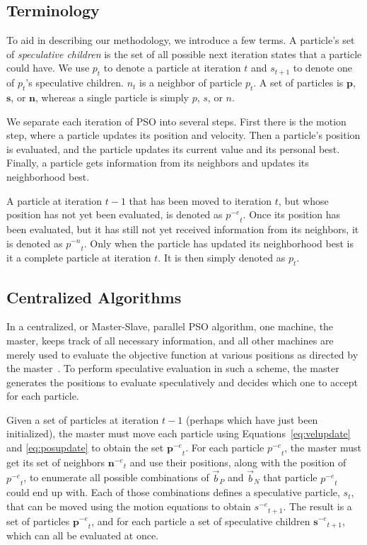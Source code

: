 \documentclass[conference,letterpaper]{IEEEtran}
\providecommand{\nbest}{\ensuremath{\Vec{b}_N}}
\providecommand{\pbest}{\ensuremath{\Vec{b}_P}}
\providecommand{\noeval}[1]{\ensuremath{#1^{-e}}}
\providecommand{\nonbest}[1]{\ensuremath{#1^{-n}}}
\providecommand{\p}{\ensuremath{p}}
\providecommand{\pset}{\ensuremath{\mathbf{p}}}
\providecommand{\s}{\ensuremath{s}}
\providecommand{\sset}{\ensuremath{\mathbf{s}}}
\providecommand{\n}{\ensuremath{n}}
\providecommand{\nset}{\ensuremath{\mathbf{n}}}
\begin{document}
\subsection{Terminology}

To aid in describing our methodology, we introduce a few terms.  A particle's
set of \emph{speculative children} is the set of all possible next iteration
states that a particle could have.  We use $\p_t$ to denote a particle at
iteration $t$ and $\s_{t+1}$ to denote one of $\p_t$'s speculative children.
$\n_t$ is a neighbor of particle $\p_t$.  A set of particles is $\pset$,
$\sset$, or $\nset$, whereas a single particle is simply $\p$, $\s$, or $\n$.

We separate each iteration of PSO into several steps.  First there is the
motion step, where a particle updates its position and velocity.  Then a
particle's position is evaluated, and the particle updates its current value
and its personal best.  Finally, a particle gets information from its neighbors
and updates its neighborhood best.

A particle at iteration $t-1$ that has been moved to iteration $t$, but whose
position has not yet been evaluated, is denoted as $\noeval{\p}_t$.  Once its
position has been evaluated, but it has still not yet received information from
its neighbors, it is denoted as $\nonbest{\p}_t$.  Only when the particle has
updated its neighborhood best is it a complete particle at iteration $t$.  It is
then simply denoted as $\p_t$.

\subsection{Centralized Algorithms}

In a centralized, or Master-Slave, parallel PSO algorithm, one machine, the
master, keeps track of all necessary information, and all other machines are
merely used to evaluate the objective function at various positions as directed
by the master~\cite{belal-ijicis04}.  To perform speculative evaluation in such
a scheme, the master generates the positions to evaluate speculatively and
decides which one to accept for each particle.

Given a set of particles at iteration $t-1$ (perhaps which have just been
initialized), the master must move each particle using
Equations~\eqref{eq:velupdate} and \eqref{eq:posupdate} to obtain the set
$\noeval{\pset}_t$.  For each particle $\noeval{\p}_t$, the master must get its
set of neighbors $\noeval{\nset}_t$ and use their positions, along with the
position of $\noeval{\p}_t$, to enumerate all possible combinations of $\pbest$
and $\nbest$ that particle $\noeval{\p}_t$ could end up with.  Each of those
combinations defines a speculative particle, $\s_t$, that can be moved using
the motion equations to obtain $\noeval{\s}_{t+1}$.  The result is a set of
particles $\noeval{\pset}_t$, and for each particle a set of speculative
children $\noeval{\sset}_{t+1}$, which can all be evaluated at once.
\end{document}
